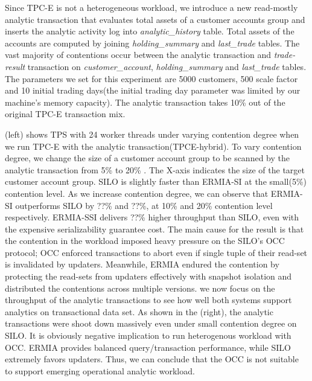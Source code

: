 Since TPC-E is not a heterogeneous workload, we introduce a new read-mostly analytic transaction that evaluates total assets of a customer accounts group and inserts the analytic activity log into \textit{analytic\_history} table. Total assets of the accounts are computed by joining \textit{holding\_summary} and \textit{last\_trade} tables. The vast majority of contentions occur between the analytic transaction and \textit{trade-result} transaction on \textit{customer\_account}, \textit{holding\_summary} and \textit{last\_trade} tables. 
The parameters we set for this experiment are 5000 customers, 500 scale factor and 10 initial trading days(the initial trading day parameter was limited by our machine's memory capacity). %
The analytic transaction takes 10\% out of the original TPC-E transaction mix. %


(left) shows TPS with 24 worker threads under varying contention degree when we run TPC-E with the analytic transaction(TPCE-hybrid). To vary contention degree, we change the size of a customer account group to be scanned by the analytic transaction from 5\% to 20\% . The X-axis indicates the size of the target customer account group. SILO is slightly faster than ERMIA-SI at the small(5\%) contention level. As we increase contention degree, we can observe that ERMIA-SI outperforms SILO by ??\% and ??\%, at 10\% and 20\% contention level respectively. ERMIA-SSI delivers ??\% higher throughput than SILO, even with the expensive serializability guarantee cost. 
The main cause for the result is that the contention in the workload imposed heavy pressure on the SILO's OCC protocol; OCC enforced transactions to abort even if single tuple of their read-set is invalidated by updaters. Meanwhile, ERMIA endured the contention by protecting the read-sets from updaters effectively with snapshot isolation and distributed the contentions across multiple versions. we now focus on the throughput of the analytic transactions to see how well both systems support analytics on transactional data set.
As shown in the (right), the analytic transactions were shoot down massively even under small contention degree on SILO. It is obviously negative implication to run heterogenous workload with OCC. ERMIA provides balanced query/transaction performance, while SILO extremely favors updaters. Thus, we can conclude that the OCC is not suitable to support emerging operational analytic workload. 

